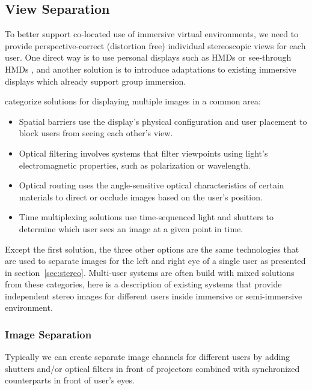 \subsection{View Separation}
To better support co-located use of immersive virtual environments, we need to provide perspective-correct (distortion free) individual stereoscopic views for each user. One direct way is to use personal displays such as HMDs \citep{Salzmann2008TUS} or see-through HMDs \citep{Schmalstieg2002Stube}, and another solution is to introduce adaptations to existing immersive displays which already support group immersion.

\citet{Bolas2004New} categorize solutions for displaying multiple images in a common area:

\begin{itemize}
\item Spatial barriers use the display's physical configuration and user placement to block users from seeing each other's view.
\item Optical filtering involves systems that filter viewpoints using light's electromagnetic properties, such as polarization or wavelength.
\item Optical routing uses the angle-sensitive optical characteristics of certain materials to direct or occlude images based on the user's position.
\item Time multiplexing solutions use time-sequenced light and shutters to determine which user sees an image at a given point in time.
\end{itemize}

Except the first solution, the three other options are the same technologies that are used to separate images for the left and right eye of a single user as presented in section~\ref{sec:stereo}. Multi-user systems are often build with mixed solutions from these categories, here is a description of existing systems that provide independent stereo images for different users inside immersive or semi-immersive environment.


\subsubsection{Image Separation} 
Typically we can create separate image channels for different users by adding shutters and/or optical filters in front of projectors combined with synchronized counterparts in front of user's eyes.

